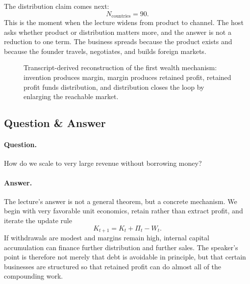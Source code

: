 The distribution claim comes next:
\begin{equation}
N_{\mathrm{countries}} = 90 .
\end{equation}
This is the moment when the lecture widens from product to channel. The host asks whether product or distribution matters more, and the answer is not a reduction to one term. The business spreads because the product exists and because the founder travels, negotiates, and builds foreign markets.

\begin{figure}
\centering
{}
\caption{Transcript-derived reconstruction of the first wealth mechanism: invention produces margin, margin produces retained profit, retained profit funds distribution, and distribution closes the loop by enlarging the reachable market.}
\end{figure}

\subsection{Question \& Answer}

\paragraph{Question.} How do we scale to very large revenue without borrowing money?

\paragraph{Answer.} The lecture's answer is not a general theorem, but a concrete mechanism. We begin with very favorable unit economics, retain rather than extract profit, and iterate the update rule
\[
K_{t+1}=K_t+\Pi_t-W_t.
\]
If withdrawals are modest and margins remain high, internal capital accumulation can finance further distribution and further sales. The speaker's point is therefore not merely that debt is avoidable in principle, but that certain businesses are structured so that retained profit can do almost all of the compounding work.

